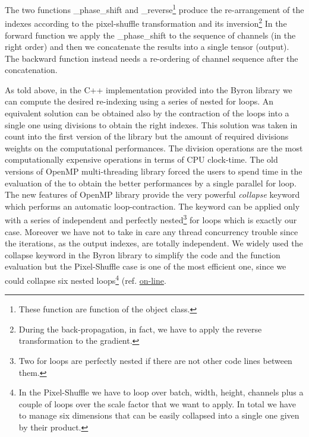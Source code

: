 \documentclass{standalone}
\begin{document}
The two functions \textsf{\_phase\_shift} and \textsf{\_reverse}\footnote{
  These function are  function of the object class.
}
produce the re-arrangement of the indexes according to the pixel-shuffle transformation and its inversion\footnote{
  During the back-propagation, in fact, we have to apply the reverse transformation to the gradient.
}
In the forward function we apply the \textsf{\_phase\_shift} to the sequence of channels (in the right order) and then we concatenate the results into a single tensor (output).
The backward function instead needs a re-ordering of channel sequence after the concatenation.

As told above, in the C++ implementation provided into the Byron library we can compute the desired re-indexing using a series of nested for loops.
An equivalent solution can be obtained also by the contraction of the loops into a single one using divisions to obtain the right indexes.
This solution was taken in count into the first version of the library but the amount of required divisions weights on the computational performances.
The division operations are the most computationally expensive operations in terms of CPU clock-time.
The old versions of OpenMP multi-threading library forced the users to spend time in the evaluation of the  to obtain the better performances by a single parallel for loop.
The new features of OpenMP library provide the very powerful \emph{collapse} keyword which performs an automatic loop-contraction.
The keyword can be applied only with a series of independent and perfectly nested\footnote{
  Two for loops are perfectly nested if there are not other code lines between them.
}
for loops which is exactly our case.
Moreover we have not to take in care any thread concurrency trouble since the iterations, as the output indexes, are totally independent.
We widely used the \textsf{collapse} keyword in the Byron library to simplify the code and the function evaluation but the Pixel-Shuffle case is one of the most efficient one, since we could collapse six nested loops\footnote{
  In the Pixel-Shuffle we have to loop over batch, width, height, channels plus a couple of loops over the scale factor that we want to apply.
  In total we have to manage six dimensions that can be easily collapsed into a single one given by their product.
} (ref. \href{https://github.com/Nico-Curti/Byron/blob/master/src/shuffler_layer.cpp}{on-line}.
\end{document}

